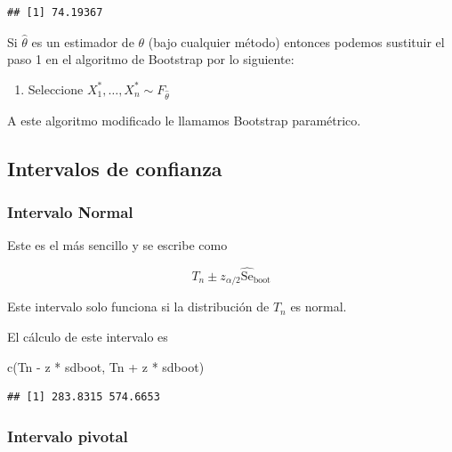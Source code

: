 \documentclass[
  12pt,
]{book}
\newenvironment{Shaded}{\begin{snugshade}}{\end{snugshade}}
\newcommand{\FunctionTok}[1]{\textcolor[rgb]{0.00,0.00,0.00}{#1}}
\newcommand{\NormalTok}[1]{#1}
\newcommand{\SpecialCharTok}[1]{\textcolor[rgb]{0.00,0.00,0.00}{#1}}
\providecommand{\tightlist}{%
  \setlength{\itemsep}{0pt}\setlength{\parskip}{0pt}}
\begin{document}
\begin{verbatim}
## [1] 74.19367
\end{verbatim}

Si \(\hat \theta\) es un estimador de \(\theta\) (bajo cualquier método)
entonces podemos sustituir el paso 1 en el algoritmo de Bootstrap por lo
siguiente:

\begin{enumerate}
\def\labelenumi{\arabic{enumi}.}
\tightlist
\item
  Seleccione \(X_{1}^{*}, \ldots, X_{n}^{*} \sim F_{\hat \theta}\)
\end{enumerate}

A este algoritmo modificado le llamamos Bootstrap paramétrico.

\hypertarget{intervalos-de-confianza}{%
\subsection{Intervalos de confianza}\label{intervalos-de-confianza}}

\hypertarget{intervalo-normal}{%
\subsubsection{Intervalo Normal}\label{intervalo-normal}}

Este es el más sencillo y se escribe como

\begin{equation}
T_{n} \pm z_{\alpha / 2} \widehat{\mathrm{Se}}_{\mathrm{boot}}
\end{equation}

Este intervalo solo funciona si la distribución de \(T_{n}\) es normal.

El cálculo de este intervalo es

\begin{Shaded}
\begin{Highlighting}[]
\FunctionTok{c}\NormalTok{(Tn }\SpecialCharTok{{-}}\NormalTok{ z }\SpecialCharTok{*}\NormalTok{ sdboot, Tn }\SpecialCharTok{+}\NormalTok{ z }\SpecialCharTok{*}\NormalTok{ sdboot)}
\end{Highlighting}
\end{Shaded}

\begin{verbatim}
## [1] 283.8315 574.6653
\end{verbatim}

\hypertarget{intervalo-pivotal}{%
\subsubsection{Intervalo pivotal}\label{intervalo-pivotal}}
\end{document}
